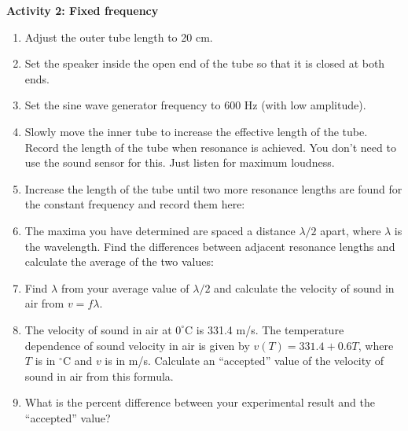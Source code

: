 {\noindent \bf Activity 2: Fixed frequency} \begin{enumerate}

\item Adjust the outer tube length to 20 cm.

\item Set the speaker inside the open end of the tube so that it is closed at both ends.

\item Set the sine wave generator frequency to 600 Hz (with low amplitude).

\item Slowly move the inner tube to increase the effective length of the tube.  Record the length of the tube when resonance is achieved. You don't need to use the sound sensor for this. Just listen for maximum loudness.\vspace{10mm}

\item Increase the length of the tube until two more resonance lengths are found for the constant frequency and record them here:\vspace{15mm}


\item The maxima you have determined are spaced a distance $\lambda/2$ apart, where $\lambda$ is the wavelength.  Find the differences between adjacent resonance lengths and calculate the average of the two values:\vspace{15mm}

\item Find $\lambda$ from your average value of $\lambda/2$ and calculate the velocity of sound in air from $v=f\lambda$.\vspace{15mm}

\item The velocity of sound in air at $0^\circ$C is 331.4 m/s.  The temperature dependence of sound velocity in air is given by $v(T) = 331.4 + 0.6T$, where $T$ is in $^\circ$C and $v$ is in m/s. Calculate an ``accepted'' value of the velocity of sound in air from this formula.

\vspace{15mm}

\item What is the percent difference between your experimental result and the ``accepted'' value?

\end{enumerate}
